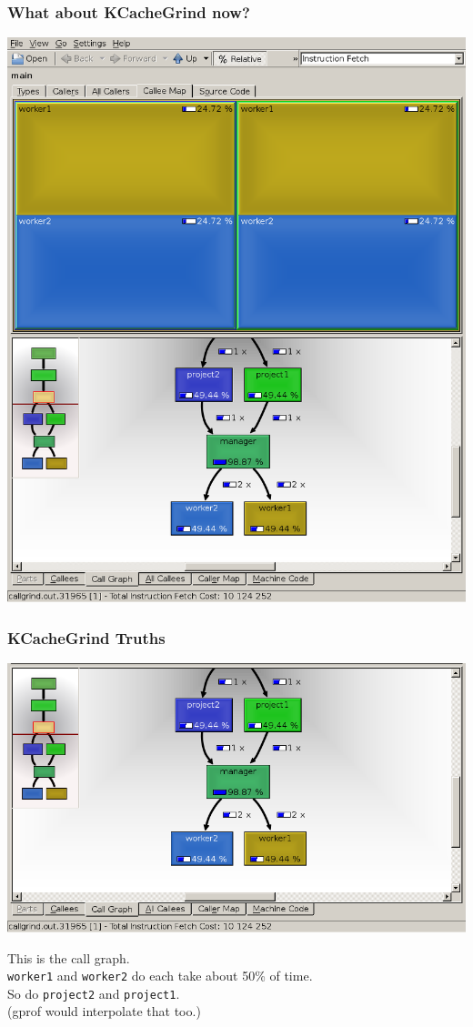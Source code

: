\documentclass[aspectratio=43]{beamer}
\newenvironment{changemargin}[1]{%
  \begin{list}{}{%
    \setlength{\topsep}{0pt}%
    \setlength{\leftmargin}{#1}%
    \setlength{\rightmargin}{1em}
    \setlength{\listparindent}{\parindent}%
    \setlength{\itemindent}{\parindent}%
    \setlength{\parsep}{\parskip}%
  }%
  \item[]}{\end{list}}
\begin{document}
\begin{frame}
  \frametitle{What about KCacheGrind now?}
  \begin{center}
    \includegraphics[width=.5\textwidth]{L27/kcachegrind2}
  \end{center}
\end{frame}

\begin{frame}
  \frametitle{KCacheGrind Truths}
  \begin{center}
    \includegraphics[width=.5\textwidth]{L27/kcachegrind2-bottom}
  \end{center}
  \begin{changemargin}{2cm}
    This is the call graph.\\
    {\tt worker1} and {\tt worker2} do each take about 50\% of time.\\
    So do {\tt project2} and {\tt project1}.\\[1em]
    (gprof would interpolate that too.)
  \end{changemargin}
\end{frame}
\end{document}
